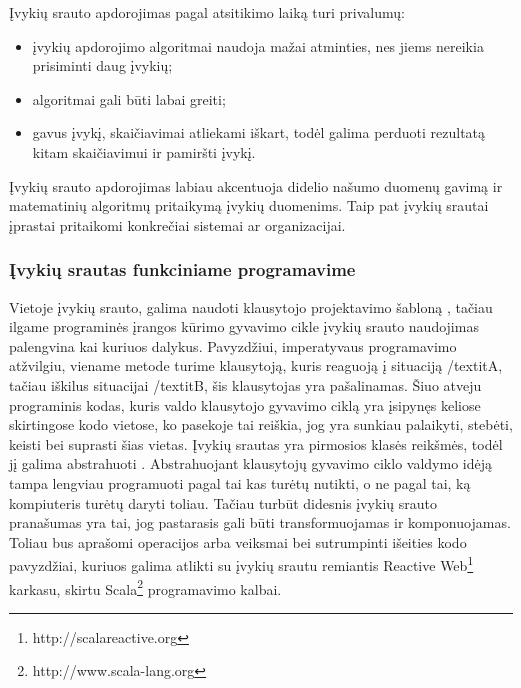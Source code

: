 Įvykių srauto apdorojimas pagal atsitikimo laiką turi privalumų:

\begin{itemize}

	\item įvykių apdorojimo algoritmai naudoja mažai atminties, nes jiems nereikia prisiminti daug įvykių;

	\item algoritmai gali būti labai greiti;

	\item gavus įvykį, skaičiavimai atliekami iškart, todėl galima perduoti rezultatą kitam skaičiavimui ir pamiršti įvykį.

\end{itemize}

Įvykių srauto apdorojimas labiau akcentuoja didelio našumo duomenų gavimą ir matematinių algoritmų pritaikymą įvykių duomenims. Taip pat įvykių srautai įprastai pritaikomi konkrečiai sistemai ar organizacijai.

\subsubsection{Įvykių srautas funkciniame programavime}

Vietoje įvykių srauto, galima naudoti klausytojo projektavimo šabloną \cite{WhiteboardPattern}, tačiau ilgame programinės įrangos kūrimo gyvavimo cikle įvykių srauto naudojimas palengvina kai kuriuos dalykus. Pavyzdžiui, imperatyvaus programavimo atžvilgiu, viename metode turime klausytoją, kuris reaguoją į situaciją /textit{A}, tačiau iškilus situacijai /textit{B}, šis klausytojas yra pašalinamas. Šiuo atveju programinis kodas, kuris valdo klausytojo gyvavimo ciklą yra įsipynęs keliose skirtingose kodo vietose, ko pasekoje tai reiškia, jog yra sunkiau palaikyti, stebėti, keisti bei suprasti šias vietas. Įvykių srautas yra pirmosios klasės reikšmės, todėl jį galima abstrahuoti \cite{EPFL-REPORT-176887}. Abstrahuojant klausytojų gyvavimo ciklo valdymo idėją tampa lengviau programuoti pagal tai kas turėtų nutikti, o ne pagal tai, ką kompiuteris turėtų daryti toliau. Tačiau turbūt didesnis įvykių srauto pranašumas yra tai, jog pastarasis gali būti transformuojamas ir komponuojamas. Toliau bus aprašomi operacijos arba veiksmai bei sutrumpinti išeities kodo pavyzdžiai, kuriuos galima atlikti su įvykių srautu remiantis Reactive Web\footnote{http://scalareactive.org} karkasu, skirtu Scala\footnote{http://www.scala-lang.org} programavimo kalbai.

